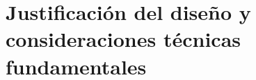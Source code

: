 \chapter{Justificación del diseño y consideraciones técnicas fundamentales}
\label{cap:JustificacionYConsideraciones}